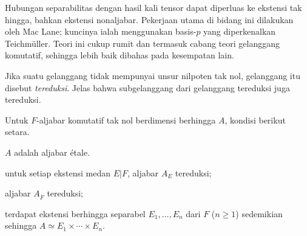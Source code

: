 Hubungan separabilitas dengan hasil kali tensor dapat diperluas ke ekstensi tak hingga, bahkan ekstensi nonaljabar. Pekerjaan utama di bidang ini dilakukan oleh Mac Lane; kuncinya ialah menggunakan basis-$p$ yang diperkenalkan Teichmüller. Teori ini cukup rumit dan termasuk cabang teori gelanggang komutatif, sehingga lebih baik dibahas pada kesempatan lain.

Jika suatu gelanggang tidak mempunyai unsur nilpoten tak nol, gelanggang itu disebut \emph{tereduksi}. Jelas bahwa subgelanggang dari gelanggang tereduksi juga tereduksi.
\begin{corollary}\label{prop:etale-alg-characterization}
	Untuk $F$-aljabar komutatif tak nol berdimensi berhingga $A$, kondisi berikut setara.
	\begin{compactenum}[(i)]
		\item $A$ adalah aljabar étale.
		\item untuk setiap ekstensi medan $E|F$, aljabar $A_E$ tereduksi;
		\item aljabar $A_{\overline{F}}$ tereduksi;
		\item terdapat ekstensi berhingga separabel $E_1, \ldots, E_n$ dari $F$ ($n \geq 1$) sedemikian sehingga $A \simeq E_1 \times \cdots \times E_n$.
	\end{compactenum}
\end{corollary}
